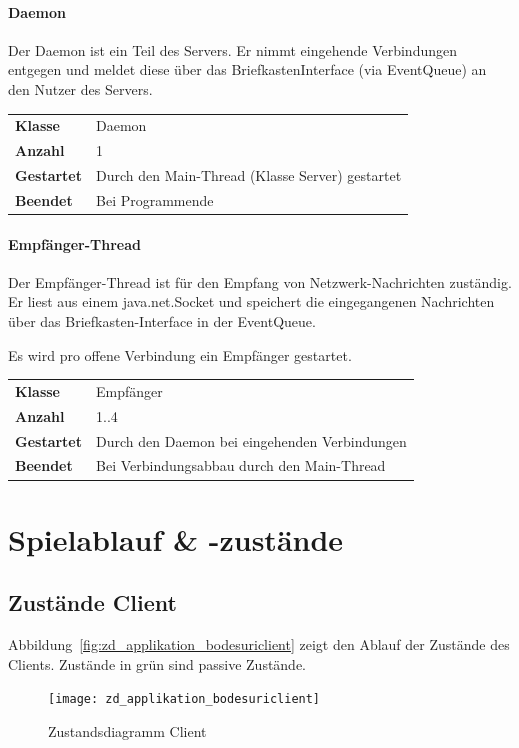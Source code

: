 \documentclass[12pt,halfparskip]{scrartcl}
\begin{document}
\paragraph{Daemon}
\label{ssub:daemon}

Der Daemon ist ein Teil des Servers. Er nimmt eingehende Verbindungen entgegen und meldet diese über das BriefkastenInterface (via EventQueue) an den Nutzer des Servers.

\begin{tabular}{@{} l p{12.5cm}}
\textbf{Klasse}       & Daemon \\
\textbf{Anzahl}       & 1 \\
\textbf{Gestartet}    & Durch den Main-Thread (Klasse Server) gestartet \\
\textbf{Beendet}      & Bei Programmende
\end{tabular}

\paragraph{Empfänger-Thread}

Der Empfänger-Thread ist für den Empfang von Netzwerk-Nachrichten zuständig. Er liest aus einem java.net.Socket und speichert die eingegangenen Nachrichten über das Briefkasten-Interface in der EventQueue.

Es wird pro offene Verbindung ein Empfänger gestartet.

\begin{tabular}{@{} l p{12.5cm}}
\textbf{Klasse}       & Empfänger \\
\textbf{Anzahl}       & 1..4 \\
\textbf{Gestartet}    & Durch den Daemon bei eingehenden Verbindungen  \\
\textbf{Beendet}      & Bei Verbindungsabbau durch den Main-Thread
\end{tabular}

\clearpage
\section{Spielablauf \& -zustände}
\label{spielzustaende_nachrichten}
\subsection{Zustände Client}
\label{sub:zustände_client}
Abbildung~\vref{fig:zd_applikation_bodesuriclient} zeigt den Ablauf der Zustände des Clients. Zustände in grün sind passive Zustände.
\begin{figure}[h]
	\centering
	\texttt{[image: zd\_applikation\_bodesuriclient]}
	\caption{Zustandsdiagramm Client}
	\label{fig:zd_applikation_bodesuriclient}
\end{figure}
\end{document}
